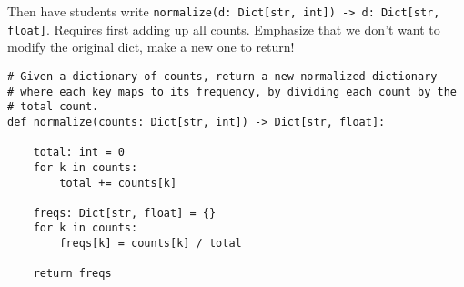 \documentclass{article}
\begin{document}
Then have students write
\verb|normalize(d: Dict[str, int]) -> d: Dict[str, float]|.  Requires
first adding up all counts.  Emphasize that we don't want to modify
the original dict, make a new one to return!

\begin{verbatim}
# Given a dictionary of counts, return a new normalized dictionary
# where each key maps to its frequency, by dividing each count by the
# total count.
def normalize(counts: Dict[str, int]) -> Dict[str, float]:

    total: int = 0
    for k in counts:
        total += counts[k]

    freqs: Dict[str, float] = {}
    for k in counts:
        freqs[k] = counts[k] / total

    return freqs
\end{verbatim}
\end{document}
